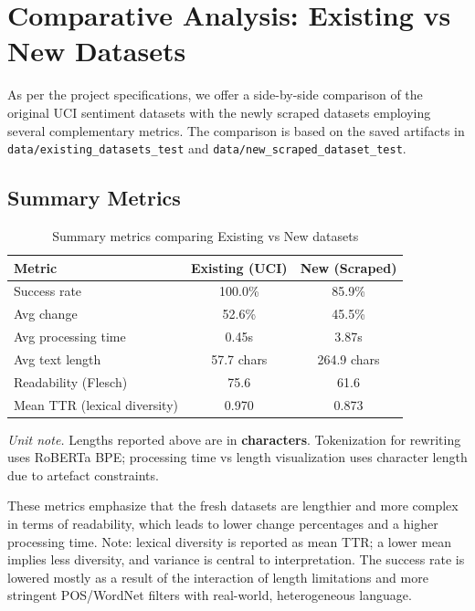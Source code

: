 \documentclass[11pt]{article}
\begin{document}
\section{Comparative Analysis: Existing vs New Datasets}
As per the project specifications, we offer a side-by-side comparison of the original UCI sentiment datasets with the newly scraped datasets employing several complementary metrics. The comparison is based on the saved artifacts in \texttt{data/existing\_datasets\_test} and \texttt{data/new\_scraped\_dataset\_test}.

\subsection{Summary Metrics}
\begin{table}[H]
  \centering
  \caption{Summary metrics comparing Existing vs New datasets}
  \begin{tabular}{lcc}
    \toprule
    Metric & Existing (UCI) & New (Scraped) \\
    \midrule
    Success rate & 100.0\% & 85.9\% \\
    Avg change & 52.6\% & 45.5\% \\
    Avg processing time & 0.45s & 3.87s \\
    Avg text length & 57.7 chars & 264.9 chars \\
    Readability (Flesch) & 75.6 & 61.6 \\
    Mean TTR (lexical diversity) & 0.970 & 0.873 \\
    \bottomrule
  \end{tabular}
\end{table}

\noindent\textit{Unit note.} Lengths reported above are in \textbf{characters}. Tokenization for rewriting uses RoBERTa BPE; processing time vs length visualization uses character length due to artefact constraints.

These metrics emphasize that the fresh datasets are lengthier and more complex in terms of readability, which leads to lower change percentages and a higher processing time. Note: lexical diversity is reported as mean TTR; a lower mean implies less diversity, and variance is central to interpretation. The success rate is lowered mostly as a result of the interaction of length limitations and more stringent POS/WordNet filters with real-world, heterogeneous language.
\end{document}
